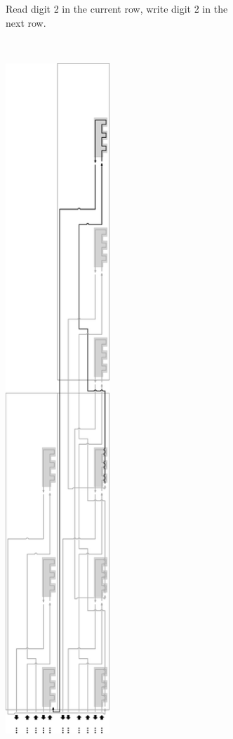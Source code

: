 \begin{figure}[H]
\begin{subfigure}[t]{0.43\textwidth}
        \caption{\label{fig:counter_read_digit2_general_case3_middle_level} Read digit 2 in the current row, write digit 2 in the next row.}
    \end{subfigure}%
    ~
    \begin{subfigure}[t]{0.43\textwidth}
        \centering
        \includegraphics[width=0.43\textwidth]{counter_read_digit3_return_read_digit1_general_case3_middle_level}

\end{subfigure}
\end{figure}
